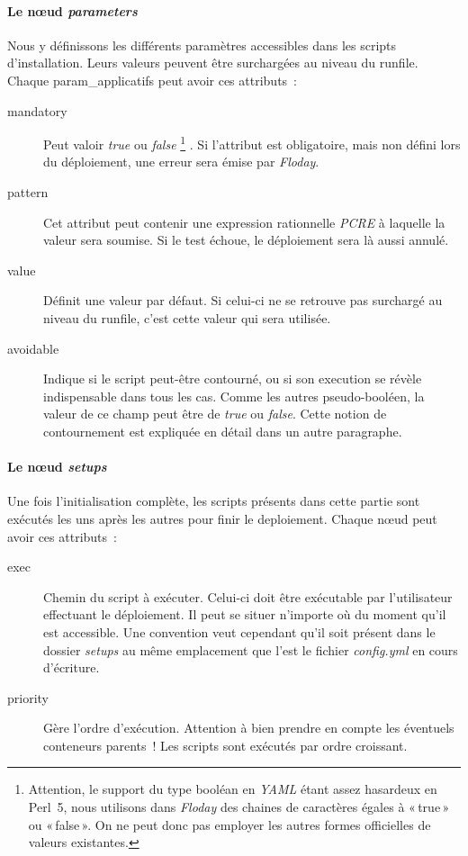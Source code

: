 \paragraph{Le nœud \emph{parameters}}
Nous y définissons les différents paramètres accessibles dans les scripts d'installation. Leurs valeurs peuvent être surchargées au niveau du \gls{runfile}.
Chaque \gls{param_applicatifs} peut avoir ces attributs~:
\begin{description}
	\item[mandatory] Peut valoir \emph{true} ou \emph{false}%
		\footnote{Attention, le support du type booléan en \emph{YAML} étant assez hasardeux en Perl~5, nous utilisons dans \emph{Floday} des chaines de caractères égales à «\,true\,» ou «\,false\,». On ne peut donc pas employer les autres formes officielles de valeurs existantes.}%
		. Si l'attribut est obligatoire, mais non défini lors du déploiement, une erreur sera émise par \emph{Floday}.
	\item[pattern] Cet attribut peut contenir une expression rationnelle \emph{PCRE} à laquelle la valeur sera soumise. Si le test échoue, le déploiement sera là aussi annulé.
	\item[value] Définit une valeur par défaut. Si celui-ci ne se retrouve pas surchargé au niveau du \gls{runfile}, c'est cette valeur qui sera utilisée.
	\item[avoidable] Indique si le script peut-être contourné, ou si son execution se révèle indispensable dans tous les cas. Comme les autres pseudo-booléen, la valeur de ce champ peut être de \emph{true} ou \emph{false}. Cette notion de contournement est expliquée en détail dans un autre paragraphe.
\end{description}

\paragraph{Le nœud \emph{setups}}
Une fois l'\gls{initialisation} complète, les scripts présents dans cette partie sont exécutés les uns après les autres pour finir le \gls{deploiement}.
Chaque nœud peut avoir ces attributs~:
\begin{description}
	\item[exec] Chemin du script à exécuter. Celui-ci doit être exécutable par l'utilisateur effectuant le déploiement. Il peut se situer n'importe où du moment qu'il est accessible. Une convention veut cependant qu'il soit présent dans le dossier \emph{setups} au même emplacement que l'est le fichier \emph{config.yml} en cours d'écriture.
	\item[priority] Gère l'ordre d'exécution. Attention à bien prendre en compte les éventuels conteneurs parents~! Les scripts sont exécutés par ordre croissant.
\end{description}

